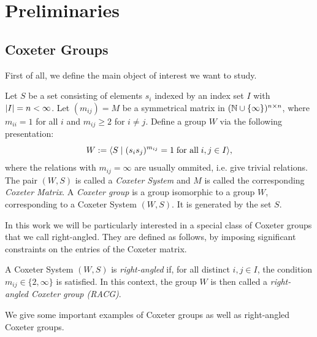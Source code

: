 \chapter{Preliminaries}\label{ch:preliminaries}

\section{Coxeter Groups}

First of all, we define the main object of interest we want to study.

\begin{definition}\label{def:CoxeterGroup}
    Let \(S\) be a set consisting of elements \(s_i\) indexed by an index set \(I\) with \(\left\vert I\right\vert = n < \infty\).
    Let  \((m_{ij}) = M\) be a symmetrical matrix in \((\mathbb{N}\cup\{\infty\})^{n\times n}\), where \(m_{ii}=1\) for all \(i\) and \(m_{ij}\geq 2\) for \(i\neq j\).
    Define a group \(W\) via the following presentation:
    \begin{equation*}
        W := \langle S\;\vert\;(s_is_j)^{m_{ij}}=1 \; \text{for all} \; i,j\in I\rangle,
    \end{equation*}
    where the relations with \(m_{ij} = \infty\) are usually ommited, i.e. give trivial relations.
    The pair \((W, S)\) is called a \emph{Coxeter System} and \(M\) is called the corresponding \emph{Coxeter Matrix}.
    A \emph{Coxeter group} is a group isomorphic to a group \(W\), corresponding to a Coxeter System \((W,S)\).
    It is generated by the set \(S\).
\end{definition}

In this work we will be particularly interested in a special class of Coxeter groups that we call right-angled.
They are defined as follows, by imposing significant constraints on the entries of the Coxeter matrix.

\begin{definition}
    A Coxeter System \((W, S)\) is \emph{right-angled} if, for all distinct \(i,j\in I\), the condition \(m_{ij}\in\{2,\infty\}\) is satisfied.
    In this context, the group \(W\) is then called a \emph{right-angled Coxeter group (RACG)}.
\end{definition}

We give some important examples of Coxeter groups as well as right-angled Coxeter groups.

